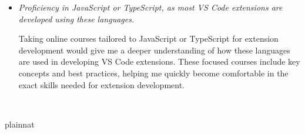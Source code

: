 \documentclass[12pt]{article}
\begin{document}
\begin{itemize}[label={}, wide=0pt, leftmargin=*]
\item \textit{Proficiency in JavaScript or TypeScript, as most VS Code extensions are developed using these languages.}

Taking online courses tailored to JavaScript or TypeScript for extension development would give me a deeper understanding of how these languages are used in developing VS Code extensions. These focused courses include key concepts and best practices, helping me quickly become comfortable  in the exact skills needed for extension development.

\end{itemize}

~\newpage

 {plainnat}

\end{document}
